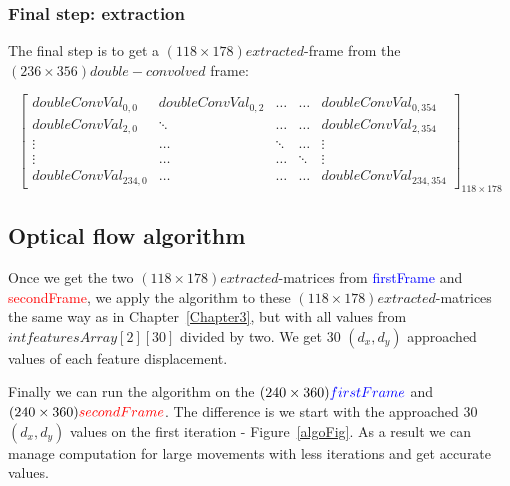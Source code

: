 \vspace{5mm}



\subsubsection{Final step: extraction}

The final step is to get a $(118\times 178)extracted$-frame from the $(236\times 356)double-convolved$ frame:

\vspace{5mm}
\[
\begin{bmatrix}

doubleConvVal_{0,0} & doubleConvVal_{0,2} & \ldots & \ldots & doubleConvVal_{0,354}\\

doubleConvVal_{2,0} & \ddots & \ldots & \ldots & doubleConvVal_{2,354}\\

\vdots & \ldots & \ddots & \ldots & \vdots\\

\vdots & \ldots & \ldots & \ddots & \vdots\\

doubleConvVal_{234,0} & \ldots & \ldots  & \ldots & doubleConvVal_{234,354}

\end{bmatrix}_{118\times 178}
\]


\subsection{Optical flow algorithm}

Once we get the two $(118\times 178)extracted$-matrices from \textcolor{blue}{firstFrame} and \textcolor{red}{secondFrame}, we apply the \flow{} algorithm to these $(118\times 178)extracted$-matrices the same way as in Chapter~\ref{Chapter3}, but with all values from $int featuresArray[2][30]$ divided by two. We get 30 $(d_{x},d_{y})$ approached values of each feature displacement.

Finally we can run the \flow{} algorithm on the $(240\times 360)\textcolor{blue}{firstFrame}$ and $(240\times 360)\textcolor{red}{secondFrame}$. The difference is we start with the approached 30 $(d_{x},d_{y})$ values on the first iteration - Figure~\ref{algoFig}. As a result we can manage \flow{} computation for large movements with less iterations and get accurate values.



